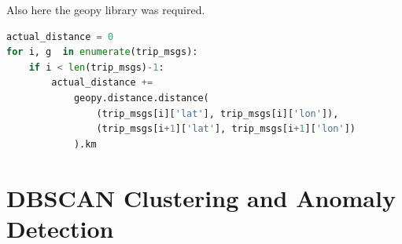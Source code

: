     Also here the geopy \cite{geopy} library was required.
        
    \begin{lstlisting}[language=Python, frame=none]
actual_distance = 0
for i, g  in enumerate(trip_msgs):
    if i < len(trip_msgs)-1:
        actual_distance += 
            geopy.distance.distance(
                (trip_msgs[i]['lat'], trip_msgs[i]['lon']),
                (trip_msgs[i+1]['lat'], trip_msgs[i+1]['lon'])
            ).km
    \end{lstlisting} 

\clearpage
\section{DBSCAN Clustering and Anomaly Detection}
    